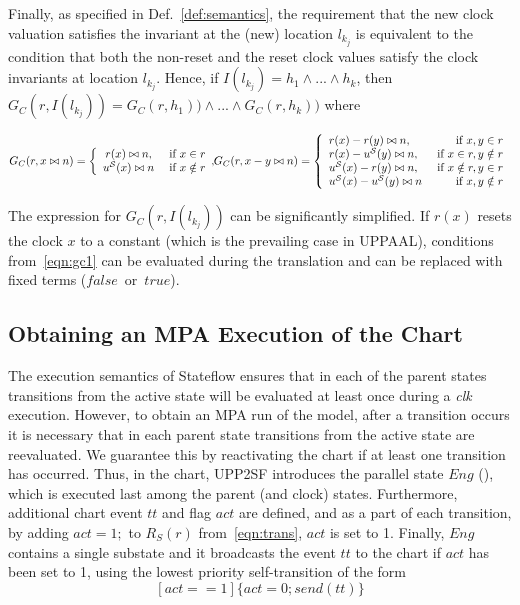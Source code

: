 Finally, as specified in Def.~\ref{def:semantics}, the requirement that the new clock valuation satisfies the invariant at the (new) location $l_{k_j}$ is equivalent to the condition that both the non-reset and the reset clock values satisfy the clock invariants at location $l_{k_j}$. Hence, if $I(l_{k_j})=h_1\wedge ...\wedge h_k$, then $G_C(r,I(l_{k_j}))=G_C(r,h_1))\wedge...\wedge G_C(r,h_k))$ where

\footnotesize
\vspace{-10pt}
\begin{equation}
\label{eqn:gc1}
G_C(r,x\bowtie n) = \left\{
\begin{array}{cc} 
r(x)\bowtie n, & \hbox{ if } x\in r\\
u^\mathcal{S}(x)\bowtie n & \hbox{ if } x\notin r 				
\end{array},
\right. 
\hspace{-5pt}
G_C(r,x-y\bowtie n) = 
\left\{
\begin{array}{lr} 
r(x)-r(y)\bowtie n, & \hbox{ if } x,y\in r\\
r(x)-u^\mathcal{S}(y)\bowtie n, & \hbox{ if } x\in r,y\notin r\\
u^\mathcal{S}(x)-r(y)\bowtie n, & \hbox{ if } x\notin r,y\in r\\
u^\mathcal{S}(x)-u^\mathcal{S}(y)\bowtie n & \hbox{ if } x,y\notin r													  
\end{array}
\right.
\end{equation}
\normalsize

\noindent 
The expression for $G_C(r,I(l_{k_j}))$ can be significantly simplified. If $r(x)$ resets the clock $x$ to a constant (which is the prevailing case in UPPAAL), conditions from~\eqref{eqn:gc1} can be evaluated during the translation and can be replaced with fixed terms ($false$~or~$true$).



\subsection{Obtaining an MPA Execution of the Chart}
\label{sec:sfmpa}
The execution semantics of Stateflow ensures that in each of the parent states transitions from the active state will be evaluated at least once during a \textit{clk} execution. However, to obtain an MPA run of the model, after a transition occurs it is necessary that in each parent state transitions from the active state are reevaluated. We guarantee this by reactivating the chart if at least one transition has occurred. Thus, in the chart, UPP2SF introduces the parallel state $Eng$ (), which is executed last among the parent (and clock) states. Furthermore, additional chart event $tt$ and flag $act$ are defined, and as a part of each transition, by adding $act=1;$ to $R_S(r)$ from~\eqref{eqn:trans}, $act$ is set to 1. 
Finally, $Eng$ contains a single substate and it broadcasts the event $tt$ to the chart if $act$ has been set to 1, using the lowest priority self-transition of the form
\begin{equation}
\label{shrst}
[act==1]\{act=0; send(tt)\}
\end{equation}



